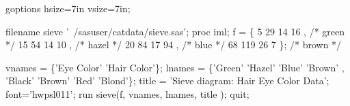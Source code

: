 \begin{listing}
goptions hsize=7in vsize=7in;
 
filename sieve '~/sasuser/catdata/sieve.sas';
proc iml;
   f = \{   5   29  14  16 ,       /* green */
          15   54  14  10 ,       /* hazel */
          20   84  17  94 ,       /* blue  */
          68  119  26   7 \};      /* brown */
 
   vnames = \{'Eye Color' 'Hair Color'\};
   lnames = \{'Green' 'Hazel' 'Blue' 'Brown' ,
             'Black' 'Brown' 'Red'  'Blond'\};
   title  = 'Sieve diagram: Hair Eye Color Data';
   font='hwpsl011';
   run sieve(f, vnames, lnames, title );
quit;
\end{listing}
